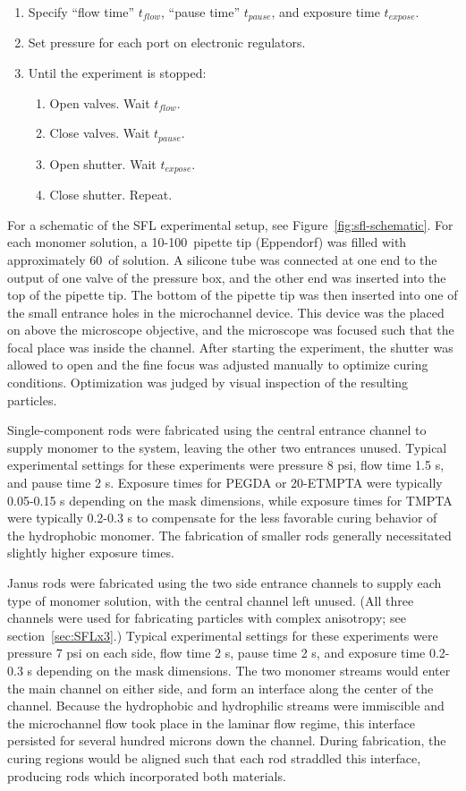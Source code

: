 \begin{enumerate}
\item Specify ``flow time'' $t_{flow}$, ``pause time'' $t_{pause}$, and exposure time $t_{expose}$.
\item Set pressure for each port on electronic regulators.
\item Until the experiment is stopped:
\begin{enumerate}
\item Open valves. Wait $t_{flow}$.
\item Close valves. Wait $t_{pause}$.
\item Open shutter. Wait $t_{expose}$.
\item Close shutter. Repeat.
\end{enumerate}
\end{enumerate}

For a schematic of the SFL experimental setup, see Figure~\ref{fig:sfl-schematic}.
For each monomer solution, a 10-100\uL~pipette tip (Eppendorf) was filled with approximately 60\uL~of solution.
A silicone tube was connected at one end to the output of one valve of the pressure box, and the other end
was inserted into the top of the pipette tip.  The bottom of the pipette tip was then inserted into one of the
small entrance holes in the microchannel device.  This device was the placed on above the microscope objective,
and the microscope was focused such that the focal place was inside the channel.  After starting the 
experiment, the shutter was allowed to open and the fine focus was adjusted manually to optimize
curing conditions. Optimization was judged by visual inspection of the resulting particles. 

Single-component rods were fabricated using the central entrance channel to supply monomer to the system, 
leaving the other two entrances unused. Typical experimental settings for these experiments were pressure
8 psi, flow time 1.5 s, and pause time 2 s.  Exposure times for PEGDA or 20-ETMPTA were typically 0.05-0.15 s
depending on the mask dimensions, while exposure times for TMPTA were typically 0.2-0.3 s to compensate for
the less favorable curing behavior of the hydrophobic monomer.  The fabrication of smaller rods generally
necessitated slightly higher exposure times.  

Janus rods were fabricated using the two side entrance channels to supply each type of monomer solution,
with the central channel left unused.  (All three channels were used for fabricating
particles with complex anisotropy; see
section~\ref{sec:SFLx3}.)  Typical experimental settings for these experiments were pressure 7 psi on each side, 
flow time 2 s, pause time 2 s, and exposure time 0.2-0.3 s depending on the mask dimensions.
The two monomer streams would enter the main channel on either side, and form
an interface along the center of the channel. Because the hydrophobic and
hydrophilic streams were immiscible and the microchannel flow took place in the laminar flow regime, 
this interface persisted for several hundred microns down the channel.
During fabrication, the curing regions would be aligned such that each rod straddled this interface,
producing rods which incorporated both materials.

